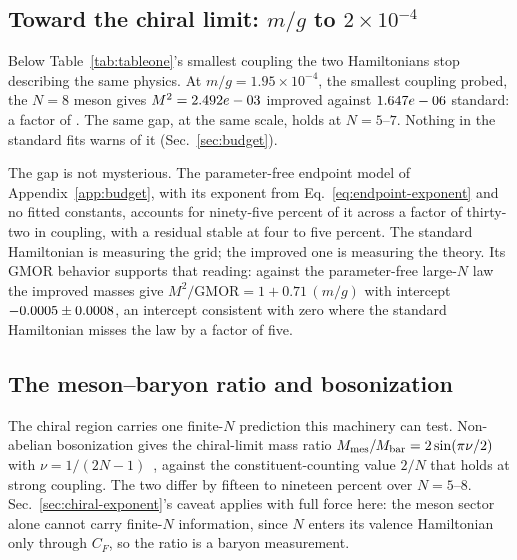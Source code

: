 \subsection{Toward the chiral limit: $m/g$ to $2\times10^{-4}$}
\label{sec:tiny-mg}

Below Table~\ref{tab:tableone}'s smallest coupling the two Hamiltonians
stop describing the same physics.  At $m/g = 1.95\times10^{-4}$, the
smallest coupling probed, the $N=8$ meson gives
$M^2 = 2.492e-03$ improved against
$1.647e-06$ standard: a factor of \numTinyNeightGap.
The same gap, at the same scale, holds at $N = 5$--$7$.  Nothing in the
standard fits warns of it (Sec.~\ref{sec:budget}).

The gap is not mysterious.  The parameter-free endpoint model of
Appendix~\ref{app:budget}, with its exponent from
Eq.~\eqref{eq:endpoint-exponent} and no fitted constants, accounts for
ninety-five percent of it across a factor of thirty-two in coupling, with
a residual stable at four to five percent.  The standard Hamiltonian is
measuring the grid; the improved one is measuring the theory.  Its GMOR
behavior supports that reading: against the parameter-free large-$N$ law
the improved masses give $M^2/\mathrm{GMOR} = 1 + 0.71\,(m/g)$ with
intercept $-0.0005 \pm 0.0008$, an intercept consistent with zero where
the standard Hamiltonian misses the law by a factor of five.

\subsection{The meson--baryon ratio and bosonization}
\label{sec:ratio}

The chiral region carries one finite-$N$ prediction this machinery can
test.  Non-abelian bosonization gives the chiral-limit mass ratio
$M_{\rm mes}/M_{\rm bar} = 2\sin(\pi\nu/2)$ with
$\nu = 1/(2N-1)$~\cite{Date:1986xe}, against the constituent-counting
value $2/N$ that holds at strong coupling.  The two differ by fifteen to
nineteen percent over $N = 5$--$8$.  Sec.~\ref{sec:chiral-exponent}'s
caveat applies with full force here: the meson sector alone cannot carry
finite-$N$ information, since $N$ enters its valence Hamiltonian only
through $C_F$, so the ratio is a baryon measurement.

